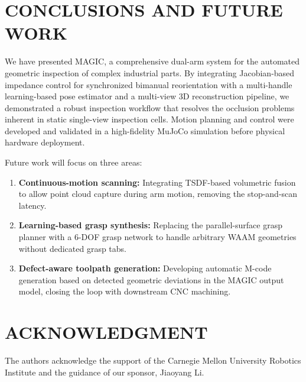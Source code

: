 \documentclass[letterpaper, 10 pt, conference]{ieeeconf}  %
\begin{document}
\section{CONCLUSIONS AND FUTURE WORK}

We have presented MAGIC, a comprehensive dual-arm system for the automated
geometric inspection of complex industrial parts. By integrating Jacobian-based
impedance control for synchronized bimanual reorientation with a multi-handle
learning-based pose estimator and a multi-view 3D reconstruction pipeline, we
demonstrated a robust inspection workflow that resolves the occlusion problems
inherent in static single-view inspection cells. Motion planning and control
were developed and validated in a high-fidelity MuJoCo simulation before
physical hardware deployment.

Future work will focus on three areas:

\begin{enumerate}
    \item \textbf{Continuous-motion scanning:} Integrating TSDF-based volumetric
    fusion to allow point cloud capture during arm motion, removing the
    stop-and-scan latency.

    \item \textbf{Learning-based grasp synthesis:} Replacing the parallel-surface
    grasp planner with a 6-DOF grasp network to handle arbitrary WAAM
    geometries without dedicated grasp tabs.

    \item \textbf{Defect-aware toolpath generation:} Developing automatic
    M-code generation based on detected geometric deviations in the MAGIC
    output model, closing the loop with downstream CNC machining.
\end{enumerate}


\section*{ACKNOWLEDGMENT}

The authors acknowledge the support of the Carnegie Mellon University Robotics
Institute and the guidance of our sponsor, Jiaoyang Li.



\end{document}
